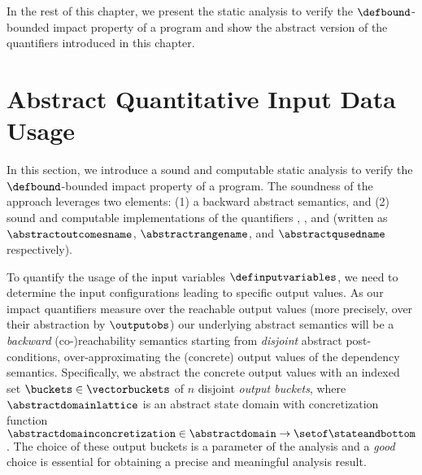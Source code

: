 In the rest of this chapter, we present the static analysis to verify the $\defbound$-bounded impact property of a program and show the abstract version of the quantifiers introduced in this chapter.

\section{Abstract Quantitative Input Data Usage}

In this section, we introduce a sound and computable static analysis to verify the $\defbound$-bounded impact property of a program.
The soundness of the approach leverages two elements: (1) a backward abstract semantics, and (2) sound and computable implementations of the quantifiers \outcomesname{}, \rangename{}, and \qusedname{} (written as $\abstractoutcomesname$, $\abstractrangename$, and $\abstractqusedname$ respectively).

To quantify the usage of the input variables $\definputvariables$, we need to determine the input configurations leading to specific output values.
As our impact quantifiers measure over the reachable output values (more precisely, over their abstraction by $\outputobs$) our underlying abstract semantics will be a \emph{backward} (co-)reachability semantics starting from \emph{disjoint} abstract post-conditions, over-approximating the (concrete) output values of the dependency semantics.
Specifically, we abstract the concrete output values with an indexed set $\buckets\in\vectorbuckets$ of $n$ disjoint \textit{output buckets}, where $\abstractdomainlattice$ is an abstract state domain with concretization function  $\abstractdomainconcretization\in\abstractdomain\to\setof\stateandbottom$. The choice of these output buckets is a parameter of the analysis and a \emph{good} choice is essential for obtaining a precise and meaningful analysis result.

